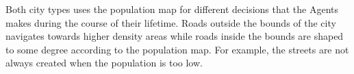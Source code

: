 Both city types uses the population map for different decisions that the Agents makes during the course of their lifetime.
Roads outside the bounds of the city navigates towards higher density areas while roads inside the bounds are shaped to some degree according to the population map.
For example, the streets are not always created when the population is too low.
